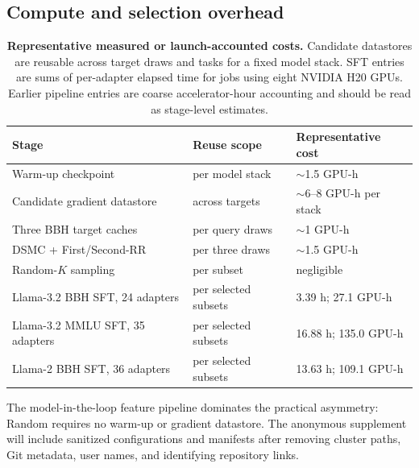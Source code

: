 \documentclass{article}
\newcommand{\method}{\textsc{DSMC}}
\begin{document}
\subsection{Compute and selection overhead}

\begin{table}[h]
\caption{\textbf{Representative measured or launch-accounted costs.}
Candidate datastores are reusable across target draws and tasks for a fixed
model stack. SFT entries are sums of per-adapter elapsed time for jobs using
eight NVIDIA H20 GPUs. Earlier pipeline entries are coarse accelerator-hour
accounting and should be read as stage-level estimates.}
\label{tab:cost}
\centering
\small
\begin{tabular}{lll}
\toprule
Stage & Reuse scope & Representative cost \\
\midrule
Warm-up checkpoint & per model stack & $\sim$1.5 GPU-h \\
Candidate gradient datastore & across targets & $\sim$6--8 GPU-h per stack \\
Three BBH target caches & per query draws & $\sim$1 GPU-h \\
\method{} + First/Second-RR & per three draws & $\sim$1.5 GPU-h \\
Random-$K$ sampling & per subset & negligible \\
Llama-3.2 BBH SFT, 24 adapters & per selected subsets & 3.39 h; 27.1 GPU-h \\
Llama-3.2 MMLU SFT, 35 adapters & per selected subsets & 16.88 h; 135.0 GPU-h \\
Llama-2 BBH SFT, 36 adapters & per selected subsets & 13.63 h; 109.1 GPU-h \\
\bottomrule
\end{tabular}
\end{table}

The model-in-the-loop feature pipeline dominates the practical asymmetry:
Random requires no warm-up or gradient datastore. The anonymous supplement
will include sanitized configurations and manifests after removing cluster
paths, Git metadata, user names, and identifying repository links.
\end{document}
